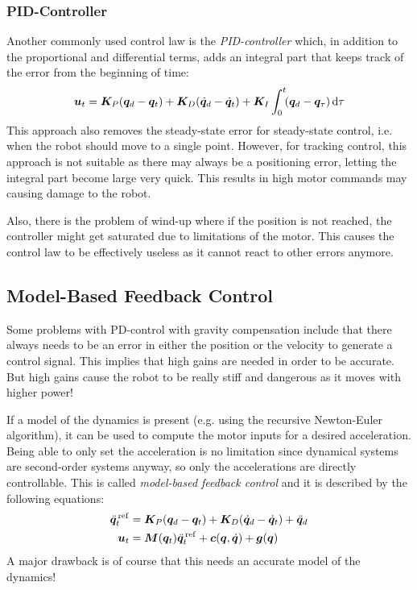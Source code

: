			\subsubsection{PID-Controller}
				Another commonly used control law is the \emph{PID-controller} which, in addition to the proportional and differential terms, adds an integral part that keeps track of the error from the beginning of time:
				\begin{equation*}
					\bm{u}_t = \bm{K}_P (\bm{q}_d - \bm{q}_t) + \bm{K}_D (\dot{\bm{q}}_d - \dot{\bm{q}}_t) + \bm{K}_I \int_0^t \! (\bm{q}_d - \bm{q}_\tau) \dd{\tau}
				\end{equation*}
				This approach also removes the steady-state error for steady-state control, i.e. when the robot should move to a single point. However, for tracking control, this approach is not suitable as there may always be a positioning error, letting the integral part become large very quick. This results in high motor commands may causing damage to the robot.

				Also, there is the problem of wind-up where if the position is not reached, the controller might get saturated due to limitations of the motor. This causes the control law to be effectively useless as it cannot react to other errors anymore.

		\subsection{Model-Based Feedback Control}
			Some problems with PD-control with gravity compensation include that there always needs to be an error in either the position or the velocity to generate a control signal. This implies that high gains are needed in order to be accurate. But high gains cause the robot to be really stiff and dangerous as it moves with higher power!

			If a model of the dynamics is present (e.g. using the recursive Newton-Euler algorithm), it can be used to compute the motor inputs for a desired acceleration. Being able to only set the acceleration is no limitation since dynamical systems are second-order systems anyway, so only the accelerations are directly controllable. This is called \emph{model-based feedback control} and it is described by the following equations:
			\begin{align*}
				\ddot{\bm{q}}_t^{\,\mathrm{ref}} & = \bm{K}_P (\bm{q}_d - \bm{q}_t) + \bm{K}_D (\dot{\bm{q}}_d - \dot{\bm{q}}_t) + \ddot{\bm{q}}_d      \\
				\bm{u}_t                         & = \bm{M}(\bm{q}_t) \ddot{\bm{q}}_t^{\,\mathrm{ref}} + \bm{c}(\bm{q}, \dot{\bm{q}}) + \bm{g}(\bm{q})
			\end{align*}
			A major drawback is of course that this needs an accurate model of the dynamics!

